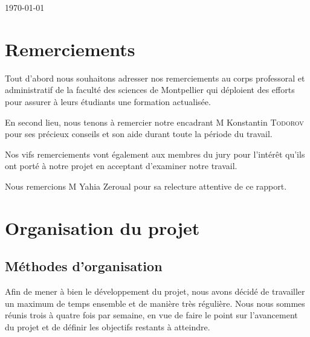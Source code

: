 \documentclass[oneside,13pt,a4paper]{report}
\begin{document}
\begin{titlepage}
	\par\vspace{1cm}

	\vfill

	{\large \today\par}
\end{titlepage}





\parskip=5pt
\chapter*{Remerciements}
\begin{center}

	Tout d'abord nous souhaitons adresser nos remerciements au corps professoral et administratif de la faculté des sciences de Montpellier qui déploient des efforts pour assurer à leurs étudiants une formation actualisée.

	En second lieu, nous tenons à remercier notre encadrant M Konstantin \textsc{Todorov} pour ses précieux conseils et son aide durant toute la période du travail.

	Nos vifs remerciements vont également aux membres du jury pour l’intérêt qu’ils ont porté à notre projet en acceptant d’examiner notre travail.

	Nous remercions M Yahia Zeroual pour sa relecture attentive de ce rapport.

\end{center}

\parskip=0pt
\tableofcontents

\parskip=5pt

\chapter{Organisation du projet}
\section{Méthodes d’organisation}

Afin de mener à bien le développement du projet, nous avons décidé de travailler un maximum de temps ensemble et de manière très régulière. Nous nous sommes réunis trois à quatre fois par semaine, en vue de faire le point sur l'avancement du projet et de définir les objectifs restants à atteindre.
\end{document}
